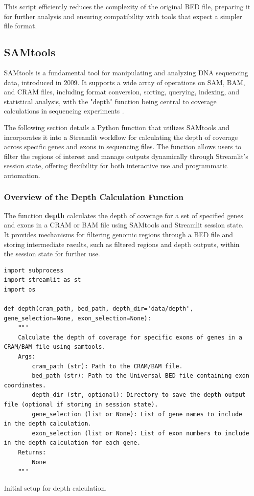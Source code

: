 This script efficiently reduces the complexity of the original BED file, preparing it for further analysis and ensuring compatibility with tools that expect a simpler file format.


\subsection{SAMtools}

SAMtools is a fundamental tool for manipulating and analyzing DNA sequencing data, introduced in 2009. It supports a wide array of operations on SAM, BAM, and CRAM files, including format conversion, sorting, querying, indexing, and statistical analysis, with the "depth" function being central to coverage calculations in sequencing experiments \cite{samtools}.

The following section details a Python function that utilizes SAMtools and incorporates it into a Streamlit workflow for calculating the depth of coverage across specific genes and exons in sequencing files. The function allows users to filter the regions of interest and manage outputs dynamically through Streamlit's session state, offering flexibility for both interactive use and programmatic automation.

\subsubsection{\textbf{Overview of the Depth Calculation Function}}

The function \textbf{depth} calculates the depth of coverage for a set of specified genes and exons in a CRAM or BAM file using SAMtools and Streamlit session state. It provides mechanisms for filtering genomic regions through a BED file and storing intermediate results, such as filtered regions and depth outputs, within the session state for further use.

\begin{longlisting}
\begin{verbatim}
import subprocess
import streamlit as st
import os

def depth(cram_path, bed_path, depth_dir='data/depth', gene_selection=None, exon_selection=None):
    """
    Calculate the depth of coverage for specific exons of genes in a CRAM/BAM file using samtools.
    Args:
        cram_path (str): Path to the CRAM/BAM file.
        bed_path (str): Path to the Universal BED file containing exon coordinates.
        depth_dir (str, optional): Directory to save the depth output file (optional if storing in session state).
        gene_selection (list or None): List of gene names to include in the depth calculation.
        exon_selection (list or None): List of exon numbers to include in the depth calculation for each gene.
    Returns:
        None
    """

\end{verbatim}
\caption{Initial setup for depth calculation.}
\label{lbl:samtools1}
\end{longlisting}


